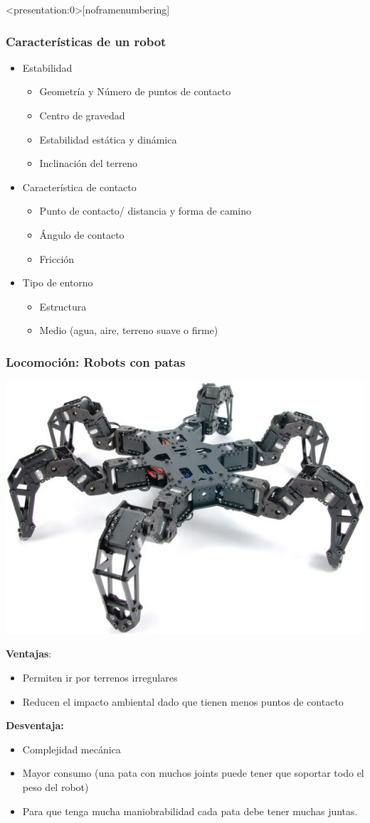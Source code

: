 \begin{frame}<presentation:0>[noframenumbering]
	\frametitle{Características de un robot}
	
	\begin{itemize}
		\item Estabilidad
		\begin{itemize}
			\item Geometría y Número de puntos de contacto
			\item Centro de gravedad
			\item Estabilidad estática y dinámica
			\item Inclinación del terreno
		\end{itemize}
		\item Característica de contacto
		\begin{itemize}
			\item Punto de contacto/ distancia y forma de camino
			\item Ángulo de contacto
			\item Fricción
		\end{itemize}
		\item Tipo de entorno
		\begin{itemize}
			\item Estructura
			\item Medio (agua, aire, terreno suave o firme)
		\end{itemize}
	\end{itemize}
\end{frame}


\begin{frame}
    \frametitle{Locomoción: Robots con patas}

    \begin{center}
        \includegraphics[width=0.4\columnwidth]{images/hexapod_phantomX_mark_II.jpg}
    \end{center}
    \footnotesize
    {\bf Ventajas}:
    \begin{itemize}
        \item Permiten ir por terrenos irregulares
        \item Reducen el impacto ambiental dado que tienen menos puntos de contacto
    \end{itemize}
    {\bf Desventaja: }
    \begin{itemize}
        \item Complejidad mecánica
        \item Mayor consumo (una pata con muchos joints puede tener que soportar todo el peso del robot)
        \item Para que tenga mucha maniobrabilidad cada pata debe tener muchas juntas.
\end{itemize}

\end{frame}


